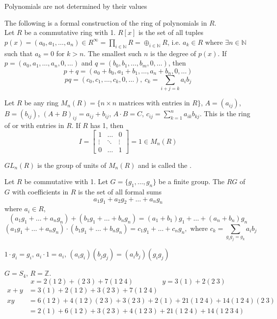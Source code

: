 \documentclass[11pt,letterpaper]{jacky}
\begin{document}
\begin{note}
    Polynomials are not determined by their values
\end{note}

The following is a formal construction of the ring of polynomials in $R$.\\

Let $R$ be a commutative ring with 1. $R[x]$ is the set of all tuples $p(x)=(a_0,a_1,\ldots,a_n)\in R^\infty=\prod_{i\in\mathbb{N}}R=\oplus_{i\in\mathbb{N}}R$, i.e. $a_k\in R$ where $\exists n\in\mathbb{N}$ such that $a_k=0$ for $k>n$. The smallest such $n$ is the degree of $p(x)$. If $p=(a_0,a_1,\ldots,a_n,0,\ldots)$ and $q=(b_0,b_1,\ldots,b_m,0,\ldots)$, then
$$p+q=(a_0+b_0,a_1+b_1,\ldots,a_n+b_n,0,\ldots)$$
$$pq=(c_0,c_1,\ldots,c_k,0,\ldots),\ c_k=\sum_{i+j=k}a_ib_j$$

\begin{defi}
    Let $R$ be any ring $M_n(R)=\{n\times n\text{ matrices with entries in $R$}\}$, $A=(a_{ij})$, $B=(b_{ij})$, $(A+B)_{ij}=a_{ij}+b_{ij}$, $A\cdot B=C$, $c_{ij}=\sum_{k=1}^na_{ik}b_{kj}$. This is the ring of  or with entries in $R$. If $R$ has 1, then
    $$I=\begin{bmatrix}
        1 & \ldots & 0 \\
        \vdots & \ddots & \vdots \\
        0 & \ldots & 1
    \end{bmatrix}=1\in M_n(R)$$
\end{defi}

\begin{defi}
    $GL_n(R)$ is the group of units of $M_n(R)$ and is called the .
\end{defi}

\begin{defi}
    Let $R$ be commutative with 1. Let $G=\{g_1,\ldots,g_n\}$ be a finite group. The  $RG$ of $G$ with coefficients in $R$ is the set of all formal sums
    $$a_1g_1+a_2g_2+\ldots+a_ng_n$$
    where $a_i\in R$,
    $$(a_1g_1+\ldots+a_ng_n)+(b_1g_1+\ldots+b_ng_n)=(a_1+b_1)g_1+\ldots+(a_n+b_n)g_n$$
    $$(a_1g_1+\ldots+a_ng_n)\cdot(b_1g_1+\ldots+b_ng_n)=c_1g_1+\ldots+c_ng_n,\text{ where $c_k=\sum_{g_ig_j=g_k}a_ib_j$}$$
\end{defi}

\begin{note}
    $1\cdot g_i=g_i$, $a_i\cdot1=a_i$, $(a_ig_i)(b_jg_j)=(a_ib_j)(g_ig_j)$
\end{note}

\begin{ex}
    $G=S_4$, $R=\mathbb{Z}$.
    $$x=2(1\ 2)+(2\ 3)+7(1\ 2\ 4)\hspace{50pt} y=3(1)+2(2\ 3)$$
    \begin{align*}
        x+y&=3(1)+2(1\ 2)+3(2\ 3)+7(1\ 2\ 4)\\
        xy&=6(1\ 2)+4(1\ 2)(2\ 3)+3(2\ 3)+2(1)+21(1\ 2\ 4)+14(1\ 2\ 4)(2\ 3)\\
          &=2(1)+6(1\ 2)+3(2\ 3)+4(1\ 2\ 3)+21(1\ 2\ 4)+14(1\ 2\ 3\ 4)
    \end{align*}
\end{ex}
\end{document}
